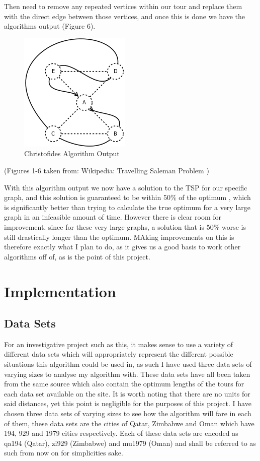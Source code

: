 \documentclass[11pt,a4paper,titlepage]{article}
\begin{document}
Then need to remove any repeated vertices within our tour and replace them with the direct edge between those vertices, and once this is done we have the algorithms output (Figure 6).

\begin{figure}[ht]
\includegraphics[scale=0.6]{WikiRemove}
\centering
\caption{Christofides Algorithm Output}
\end{figure}

(Figures 1-6 taken from: Wikipedia: Travelling Saleman Problem \cite{TSPWiki})

With this algorithm output we now have a solution to the TSP for our specific graph, and this solution is guaranteed to be within 50\% of the optimum \cite{ChrAlg}, which is significantly better than trying to calculate the true optimum for a very large graph in an infeasible amount of time. However there is clear room for improvement, since for these very large graphs, a solution that is 50\% worse is still drastically longer than the optimum. MAking improvements on this is therefore exactly what I plan to do, as it gives us a good basis to work other algorithms off of, as is the point of this project.

\section{Implementation}

\subsection{Data Sets}

For an investigative project such as this, it makes sense to use a variety of different data sets which will appropriately represent the different possible situations this algorithm could be used in, as such I have used three data sets of varying sizes to analyse my algorithm with. These data sets have all been taken from the same source \cite{TSPRep1} which also contain the optimum lengths of the tours for each data set available on the site. It is worth noting that there are no units for said distances, yet this point is negligible for the purposes of this project. I have chosen three data sets of varying sizes to see how the algorithm will fare in each of them, these data sets are the cities of Qatar, Zimbabwe and Oman which have 194, 929 and 1979 cities respectively. Each of these data sets are encoded as qa194 (Qatar), zi929 (Zimbabwe) and mu1979 (Oman) and shall be referred to as such from now on for simplicities sake.
\pagebreak
\end{document}

